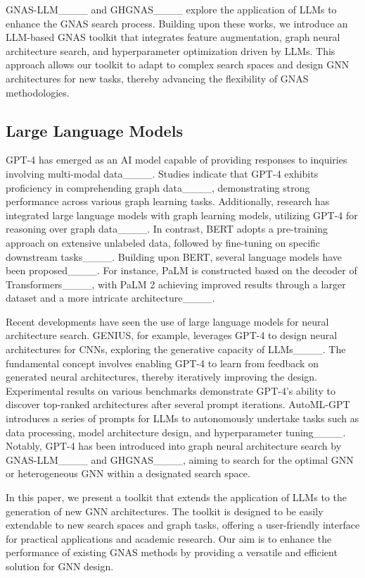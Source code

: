 GNAS-LLM____ and GHGNAS____ explore the application of LLMs to enhance the GNAS search process. Building upon these works, we introduce an LLM-based GNAS toolkit that integrates feature augmentation, graph neural architecture search, and hyperparameter optimization driven by LLMs. This approach allows our toolkit to adapt to complex search spaces and design GNN architectures for new tasks, thereby advancing the flexibility of GNAS methodologies.

\subsection{Large Language Models}

GPT-4 has emerged as an AI model capable of providing responses to inquiries involving multi-modal data____. Studies indicate that GPT-4 exhibits proficiency in comprehending graph data____, demonstrating strong performance across various graph learning tasks. Additionally, research has integrated large language models with graph learning models, utilizing GPT-4 for reasoning over graph data____. In contrast, BERT adopts a pre-training approach on extensive unlabeled data, followed by fine-tuning on specific downstream tasks____. Building upon BERT, several language models have been proposed____. For instance, PaLM is constructed based on the decoder of Transformers____, with PaLM 2 achieving improved results through a larger dataset and a more intricate architecture____.

Recent developments have seen the use of large language models for neural architecture search. GENIUS, for example, leverages GPT-4 to design neural architectures for CNNs, exploring the generative capacity of LLMs____. The fundamental concept involves enabling GPT-4 to learn from feedback on generated neural architectures, thereby iteratively improving the design. Experimental results on various benchmarks demonstrate GPT-4's ability to discover top-ranked architectures after several prompt iterations. AutoML-GPT introduces a series of prompts for LLMs to autonomously undertake tasks such as data processing, model architecture design, and hyperparameter tuning____. Notably, GPT-4 has been introduced into graph neural architecture search by GNAS-LLM____ and GHGNAS____, aiming to search for the optimal GNN or heterogeneous GNN within a designated search space.

In this paper, we present a toolkit that extends the application of LLMs to the generation of new GNN architectures. The toolkit is designed to be easily extendable to new search spaces and graph tasks, offering a user-friendly interface for practical applications and academic research. Our aim is to enhance the performance of existing GNAS methods by providing a versatile and efficient solution for GNN design.